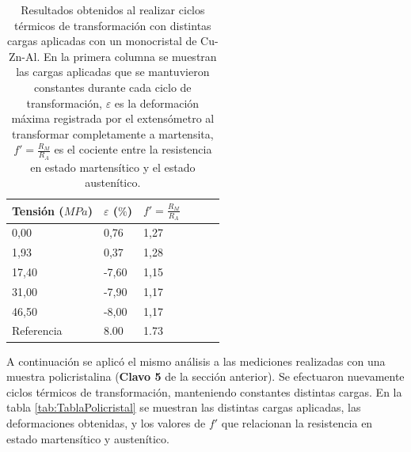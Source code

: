 \documentclass[a4paper,12pt,fleqn,twoside,openany]{book}
\begin{document}
\begin{table} 
\begin{center} 
\begin{tabular}{@{}llllll@{}} \toprule
Tensión ($MPa$) & $\varepsilon$ ($\%$) &  $f'=\frac{R_M}{R_A}$\\ \midrule
 0,00       &  0,76   & 1,27\\
 1,93       &  0,37   & 1,28\\
 17,40      &  -7,60  & 1,15\\
 31,00      &  -7,90  & 1,17\\
 46,50     &  -8,00  & 1,17  \\
 Referencia \cite{resistencia}    & 8.00  &  1.73   \\
 \bottomrule
\end{tabular}
\caption{Resultados obtenidos al realizar ciclos térmicos de transformación con distintas cargas aplicadas con un monocristal de Cu-Zn-Al. En la primera columna se muestran las cargas aplicadas que se mantuvieron constantes durante cada ciclo de transformación, $\varepsilon$ es la deformación máxima registrada por el extensómetro al transformar completamente a martensita, $f'=\frac{R_M}{R_A}$ es el cociente entre la resistencia en estado martensítico y el estado austenítico.}
\label{tab:TablaMonocristal}
\end{center}
\end{table}


A continuación se aplicó el mismo análisis a las mediciones realizadas con una muestra policristalina (\textbf{Clavo 5} de la sección anterior). Se efectuaron nuevamente ciclos térmicos de transformación, manteniendo constantes distintas cargas. En la tabla \ref{tab:TablaPolicristal} se muestran las distintas cargas aplicadas, las deformaciones obtenidas, y los valores de $f'$ que relacionan la resistencia en estado martensítico y austenítico. 
\end{document}

